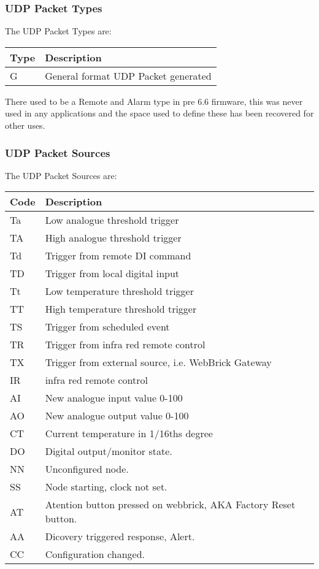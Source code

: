 \subsubsection{UDP Packet Types}
	
The UDP Packet Types are:

	\begin{tabular}{l|p{12cm}}
	Type&Description\\
    \hline
	G&General format UDP Packet generated\\
	\end{tabular}

    There used to be a Remote and Alarm type in pre 6.6 firmware, this was never used in any applications and the space used to define these has been recovered for other uses.
    
\subsubsection{UDP Packet Sources}
	
The UDP Packet Sources are:

	\begin{tabular}{l|p{12cm}}
	Code&Description\\
    \hline
	Ta&Low analogue threshold trigger\\
	TA&High analogue threshold trigger\\
	Td&Trigger from remote DI command\\
	TD&Trigger from local digital input\\
	Tt&Low temperature threshold trigger\\
	TT&High temperature threshold trigger\\
	TS&Trigger from scheduled event\\
	TR&Trigger from infra red remote control\\
	TX&Trigger from external source, i.e. WebBrick Gateway\\
	IR&infra red remote control\\
	AI&New analogue input value 0-100\\
	AO&New analogue output value 0-100\\
	CT&Current temperature in 1/16ths degree\\
	DO&Digital output/monitor state.\\
	NN&Unconfigured node.\\
	SS&Node starting, clock not set.\\
	AT&Atention button pressed on webbrick, AKA Factory Reset button.\\
	AA&Dicovery triggered response, Alert.\\
	CC&Configuration changed.\\
	\end{tabular}

